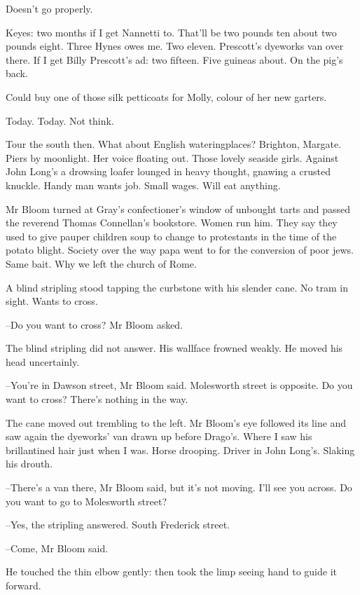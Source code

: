 Doesn't go properly.

Keyes: two months if I get Nannetti to.
That'll be two pounds ten
about two pounds eight.
Three Hynes owes me.
Two eleven.
Prescott's dyeworks van over there.
If I get Billy Prescott's ad:
two fifteen.
Five guineas about.
On the pig's back.

Could buy one of those silk petticoats for Molly,
colour of her new garters.

Today.
Today.
Not think.

Tour the south then.
What about English wateringplaces?
Brighton, Margate.
Piers by moonlight.
Her voice floating out.
Those lovely seaside girls.
Against John Long's
a drowsing loafer lounged in heavy thought,
gnawing a crusted knuckle.
Handy man wants job.
Small wages.
Will eat anything.

Mr Bloom turned at Gray's confectioner's window of unbought tarts
and passed the reverend Thomas Connellan's bookstore.
Women run him.
They say they used to give pauper children soup
to change to protestants in the time of the potato blight.
Society over the way papa went to for the conversion of poor jews.
Same bait.
Why we left the church of Rome.

A blind stripling stood tapping the curbstone with his slender cane.
No tram in sight.
Wants to cross.

--Do you want to cross?
Mr Bloom asked.

The blind stripling did not answer.
His wallface frowned weakly.
He moved his head uncertainly.

--You're in Dawson street,
Mr Bloom said.
Molesworth street is opposite.
Do you want to cross?
There's nothing in the way.

The cane moved out trembling to the left.
Mr Bloom's eye followed its line and saw again the dyeworks' van drawn up before Drago's.
Where I saw his brillantined hair just when I was.
Horse drooping.
Driver in John Long's.
Slaking his drouth.

--There's a van there,
Mr Bloom said,
but it's not moving.
I'll see you across.
Do you want to go to Molesworth street?

--Yes,
the stripling answered.
South Frederick street.

--Come,
Mr Bloom said.

He touched the thin elbow gently:
then took the limp seeing hand to guide it forward.

